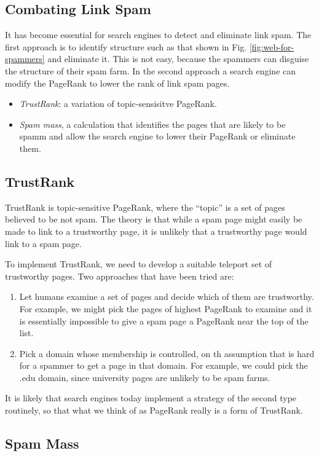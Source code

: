 \subsection{Combating Link Spam}\label{subsec:combating-link-spam}

It has become essential for search engines to detect and eliminate link spam. The first approach is to identify structure such as that shown in Fig. \ref{fig:web-for-spammers} and eliminate it. This is not easy, because the spammers can disguise the structure of their spam farm. In the second approach a search engine can modify the PageRank to lower the rank of link spam pages. 
\begin{itemize}
    \item \textit{TrustRank}: a variation of topic-sensisitve PageRank.
    \item \textit{Spam mass}, a calculation that identifies the pages that are likely to be spamm and allow the search engine to lower their PageRank or eliminate them.
\end{itemize}

\subsection{TrustRank}\label{subsec:trust-rank}

TrustRank is topic-sensitive PageRank, where the ``topic'' is a set of pages believed to be not spam. The theory is that while a spam page might easily be made to link to a trustworthy page, it is unlikely that a trustworthy page would link to a spam page.

To implement TrustRank, we need to develop a suitable teleport set of trustworthy pages. Two approaches that have been tried are:

\begin{enumerate}
    \item Let humans examine a set of pages and decide which of them are trustworthy. For example, we might pick the pages of highest PageRank to examine and it is essentially impossible to give a spam page a PageRank near the top of the list. 
    \item Pick a domain whose membership is controlled, on th assumption that is hard for a spammer to get a page in that domain. For example, we could pick the .edu domain, since university pages are unlikely to be spam farms.
\end{enumerate}

It is likely that search engines today implement a strategy of the second type routinely, so that what we think of as PageRank really is a form of TrustRank.

\subsection{Spam Mass}\label{subsec:spam-mass}

